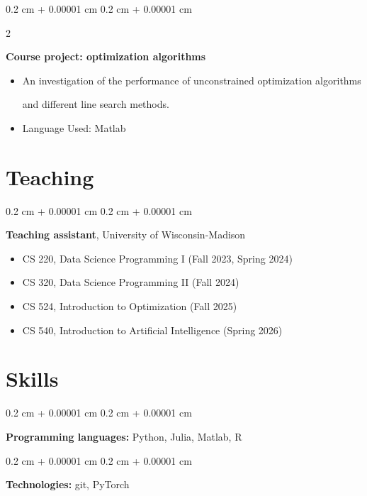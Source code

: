 \documentclass[10pt, letterpaper]{article}
\newenvironment{highlights}{
    \begin{itemize}[
        topsep=0.10 cm,
        parsep=0.10 cm,
        partopsep=0pt,
        itemsep=0pt,
        leftmargin=0.4 cm + 10pt
    ]
}{
    \end{itemize}
} %
\newenvironment{onecolentry}{
    \begin{adjustwidth}{
        0.2 cm + 0.00001 cm
    }{
        0.2 cm + 0.00001 cm
    }
}{
    \end{adjustwidth}
} %
\newenvironment{twocolentry}[2][]{
    \onecolentry
    \def\secondColumn{#2}
    \setcolumnwidth{\fill, 4.5 cm}
    \begin{paracol}{2}
}{
    \switchcolumn \raggedleft \secondColumn
    \end{paracol}
    \endonecolentry
} %
\let\hrefWithoutArrow\href
\renewcommand{\href}[2]{\hrefWithoutArrow{#1}{\ifthenelse{\equal{#2}{}}{ }{#2 }\raisebox{.15ex}{\footnotesize \faExternalLink*}}}
\begin{document}
        \vspace{0.2 cm}

        \begin{twocolentry}{
            \href{https://github.com/Tuna2222/Course-projects/tree/main/IOE-511}{IOE-511}
        }
            \textbf{Course project: optimization algorithms}
            \begin{highlights}
                \item An investigation of the performance of unconstrained optimization algorithms 
                
                and different 
                line search methods.
                \item Language Used: Matlab
            \end{highlights}
        \end{twocolentry}



    \section{Teaching}
    \begin{onecolentry}
        \textbf{Teaching assistant}, University of Wisconsin-Madison
        \begin{highlights}
            \item CS 220, Data Science Programming I (Fall 2023, Spring 2024)
            \item CS 320, Data Science Programming II (Fall 2024)
            \item CS 524, Introduction to Optimization (Fall 2025)
            \item CS 540, Introduction to Artificial Intelligence (Spring 2026)
        \end{highlights}


    \end{onecolentry}



    
    \section{Skills}



        
        \begin{onecolentry}
            \textbf{Programming languages:} Python, Julia, Matlab, R
        \end{onecolentry}

        \vspace{0.2 cm}

        \begin{onecolentry}
            \textbf{Technologies:} git, PyTorch
        \end{onecolentry}
\end{document}
